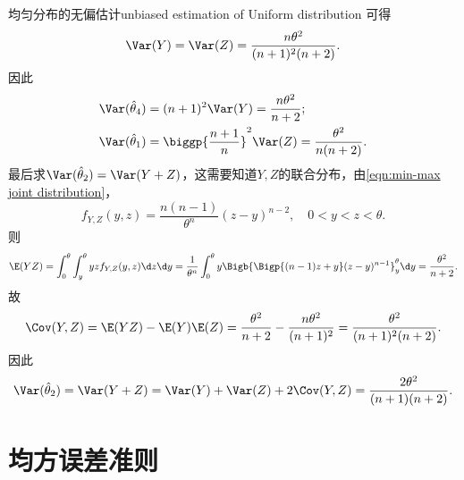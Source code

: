 \begin{example}{均匀分布的无偏估计}{unbiased estimation of Uniform distribution}
	可得 
	\begin{equation}
		\Var(Y)=\Var(Z)=\frac{n\theta^2}{(n+1)^2(n+2)}.
	\end{equation}
	因此
	\begin{align*}
		\Var(\hat\theta_4)&=(n+1)^2\Var(Y)=\frac{n\theta^2}{n+2};\\
		\Var(\hat\theta_1)&=\biggp{\frac{n+1}n}^2\Var(Z)=\frac{\theta^2}{n(n+2)}.
	\end{align*}
	最后求$\Var(\hat\theta_2)=\Var(Y+Z)$，这需要知道$Y,Z$的联合分布，由\eqref{eqn:min-max joint distribution}，
	\begin{equation}
		f_{Y,Z}(y,z)=\frac{n(n-1)}{\theta^n}(z-y)^{n-2},\quad 0<y<z<\theta.
	\end{equation}
	则
	\[
		\E(YZ)=\int_0^\theta\int_y^\theta yzf_{Y,Z}(y,z)\d z\d y=\frac1{\theta^n}\int_0^\theta y\Bigb{\Bigp{(n-1)z+y}(z-y)^{n-1}}_y^\theta\d y=\frac{\theta^2}{n+2}.
	\]
	故
	\begin{equation}
		\Cov(Y,Z)=\E(YZ)-\E(Y)\E(Z)=\frac{\theta^2}{n+2}-\frac{n\theta^2}{(n+1)^2}=\frac{\theta^2}{(n+1)^2(n+2)}.
	\end{equation}
	因此
	\[
		\Var(\hat\theta_2)=\Var(Y+Z)=\Var(Y)+\Var(Z)+2\Cov(Y,Z)=\frac{2\theta^2}{(n+1)(n+2)}.
	\]
\end{example}

\section{均方误差准则}

